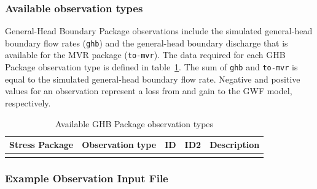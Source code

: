 \vspace{5mm}
\subsubsection{Available observation types}
General-Head Boundary Package observations include the simulated general-head boundary flow rates (\texttt{ghb}) and the general-head boundary discharge that is available for the MVR package (\texttt{to-mvr}). The data required for each GHB Package observation type is defined in table~\ref{table:gwf-ghbgobstype}. The sum of \texttt{ghb} and \texttt{to-mvr} is equal to the simulated general-head boundary flow rate. Negative and positive values for an observation represent a loss from and gain to the GWF model, respectively.

\begin{longtable}{p{2cm} p{2.75cm} p{2cm} p{1.25cm} p{7cm}}
\caption{Available GHB Package observation types} \tabularnewline

\hline
\hline
\textbf{Stress Package} & \textbf{Observation type} & \textbf{ID} & \textbf{ID2} & \textbf{Description} \\
\hline
\endhead

\hline
\endfoot


\label{table:gwf-ghbgobstype}
\end{longtable}

\vspace{5mm}
\subsubsection{Example Observation Input File}

